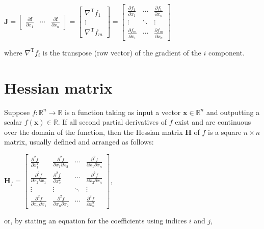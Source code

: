 \documentclass[11pt]{elegantbook}
\begin{document}
$
\mathbf{J}=\left[\begin{array}{ccc}
\frac{\partial \mathbf{f}}{\partial x_{1}} & \cdots & \frac{\partial \mathbf{f}}{\partial x_{n}}
\end{array}\right]=\left[\begin{array}{c}
\nabla^{\mathrm{T}} f_{1} \\
\vdots \\
\nabla^{\mathrm{T}} f_{m}
\end{array}\right]=\left[\begin{array}{ccc}
\frac{\partial f_{1}}{\partial x_{1}} & \cdots & \frac{\partial f_{1}}{\partial x_{n}} \\
\vdots & \ddots & \vdots \\
\frac{\partial f_{m}}{\partial x_{1}} & \cdots & \frac{\partial f_{m}}{\partial x_{n}}
\end{array}\right]
$

where $\nabla^{\mathrm{T}} f_{i}$ is the transpose (row vector) of the gradient of the $i$ component.

\section{Hessian matrix}
Suppose $f: \mathbb{R}^{n} \rightarrow \mathbb{R}$ is a function taking as input a vector $\mathbf{x} \in \mathbb{R}^{n}$ and outputting a scalar $f(\mathbf{x}) \in \mathbb{R}$. If all second partial derivatives of $f$ exist and are continuous over the domain of the function, then the Hessian matrix $\mathbf{H}$ of $f$ is a square $n \times n$ matrix, usually defined and arranged as follows:

$
\mathbf{H}_{f}=\left[\begin{array}{cccc}
\frac{\partial^{2} f}{\partial x_{1}^{2}} & \frac{\partial^{2} f}{\partial x_{1} \partial x_{2}} & \cdots & \frac{\partial^{2} f}{\partial x_{1} \partial x_{n}} \\
\frac{\partial^{2} f}{\partial x_{2} \partial x_{1}} & \frac{\partial^{2} f}{\partial x_{2}^{2}} & \cdots & \frac{\partial^{2} f}{\partial x_{2} \partial x_{n}} \\
\vdots & \vdots & \ddots & \vdots \\
\frac{\partial^{2} f}{\partial x_{n} \partial x_{1}} & \frac{\partial^{2} f}{\partial x_{n} \partial x_{2}} & \cdots & \frac{\partial^{2} f}{\partial x_{n}^{2}}
\end{array}\right],
$

or, by stating an equation for the coefficients using indices $i$ and $j$,
\end{document}
